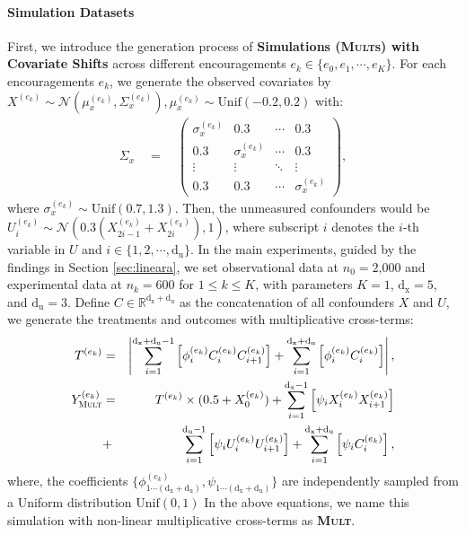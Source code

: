 \documentclass[journal]{IEEEtran}
\begin{document}
\paragraph{Simulation Datasets} First, we introduce the generation process of \textbf{Simulations (\textsc{Mult}s) with Covariate Shifts} across different encouragements $ e_k \in \{e_0, e_1, \cdots, e_K\}$. For each encouragements $e_k$, we generate the observed covariates by $X^{(e_k)} \sim  \mathcal{N}(\mu_x^{(e_k)},\Sigma_x^{(e_k)}), \mu_x^{(e_k)} \sim \text{Unif}(-0.2,0.2)$ with:
\begin{eqnarray}
\nonumber
\Sigma_x \quad = \quad
\begin{pmatrix}
\sigma_x^{(e_k)} & 0.3 & \cdots & 0.3 \\
0.3 & \sigma_x^{(e_k)} & \cdots & 0.3 \\
\vdots & \vdots & \ddots & \vdots \\
0.3 & 0.3 & \cdots & \sigma_x^{(e_k)}
\end{pmatrix},
\end{eqnarray}
where $\sigma_x^{(e_k)} \sim \text{Unif}(0.7,1.3)$. Then, the unmeasured confounders would be $ U_i^{(e_k)} \sim \mathcal{N}(0.3(X^{(e_k)}_{2i-1}+X^{(e_k)}_{2i}),1) $, where subscript $i$ denotes the $i$-th variable in $U$ and $i \in \{1,2,\cdots, \text{d}_\text{u}\}$. 
In the main experiments, guided by the findings in Section \ref{sec:lineara}, we set observational data at $n_0 = \text{2,000}$ and experimental data at $n_k = 600$ for $1 \leq k \leq K$, with parameters $K = 1$, $\text{d}_\text{x} = 5$, and $\text{d}_\text{u} = 3$.
Define $C \in \mathbb{R}^{\text{d}_\text{x}+\text{d}_\text{u}}$ as the concatenation of all confounders $X$ and $U$, we generate the treatments and outcomes with multiplicative cross-terms:  
{ \small
\begin{eqnarray}
\nonumber
T^{(e_k)} & = & \left| \sum_{i=1}^{\text{d}_\text{x}+\text{d}_\text{u}-1} \left[\phi_i^{(e_k)}C_i^{(e_k)}  C_{i+1}^{(e_k)}\right] + \sum_{i=1}^{\text{d}_\text{x}+\text{d}_\text{u}} \left[\phi_{i}^{(e_k)}C_{i}^{(e_k)}\right] \right|, \\
Y^{(e_k)}_{\textsc{Mult}} & = & T^{(e_k)} \times (0.5+X_0^{(e_k)}) + \sum_{i=1}^{\text{d}_\text{x}-1} \left[\psi_iX_i^{(e_k)}  X_{i+1}^{(e_k)}\right] 
\nonumber \\ 
&+& \sum_{i=1}^{\text{d}_\text{u}-1} \left[\psi_iU_i^{(e_k)}  U_{i+1}^{(e_k)}\right] + \sum_{i=1}^{\text{d}_\text{x}+\text{d}_\text{u}} \left[\psi_iC_i^{(e_k)}\right],
\nonumber
\end{eqnarray}
}where, the coefficients $\{\phi_{1 \cdots (\text{d}_\text{x}+\text{d}_\text{u})}^{(e_k)}, \psi_{1 \cdots (\text{d}_\text{x}+\text{d}_\text{u})}\}$ are independently sampled from a Uniform distribution $\text{Unif}(0,1)$
In the above equations, we name this simulation with non-linear multiplicative cross-terms as \textbf{\textsc{Mult}}. 
\end{document}
